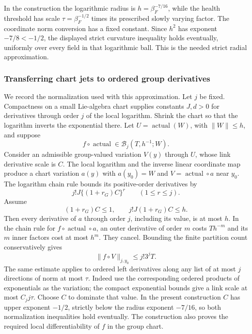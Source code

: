 In the construction the logarithmic radius is
$h=\beta_F^{-7/16}$, while the health threshold has scale
$\tau=\beta_F^{-1/2}$ times its prescribed slowly varying factor.
The coordinate norm conversion has a fixed constant. Since
$h^2$ has exponent $-7/8<-1/2$, the displayed strict curvature
inequality holds eventually, uniformly over every field in that
logarithmic ball. This is the needed strict radial approximation.

\subsubsection{Transferring chart jets to ordered group derivatives}
We record the normalization used with this approximation. Let $j$
be fixed. Compactness on a small Lie-algebra chart supplies constants
$J,d>0$ for derivatives through order $j$ of the local logarithm.
Shrink the chart so that the logarithm inverts the exponential there.
Let $U=\operatorname{actual}(W)$, with $\|W\|\le h$, and suppose
\[
            f\circ\operatorname{actual}\in
                       \mathcal B_j(T,h^{-1};W).
\]
Consider an admissible group-valued variation $V(y)$ through $U$,
whose link derivative scale is $C$. The local logarithm and the
inverse linear coordinate map produce a chart variation $a(y)$
with $a(y_0)=W$ and $V=\operatorname{actual}\circ a$ near $y_0$.
The logarithm chain rule bounds its positive-order derivatives by
\[
             j!J\{(1+r_G)C\}^{r}\qquad(1\le r\le j).
\]
Assume
\[
       (1+r_G)C\le1,
             \qquad j!J(1+r_G)C\le h.
\]
Then every derivative of $a$ through order $j$, including its value,
is at most $h$. In the chain rule for $f\circ\operatorname{actual}\circ a$,
an outer derivative of order $m$ costs $Th^{-m}$ and its $m$
inner factors cost at most $h^m$. They cancel. Bounding the finite
partition count conservatively gives
\begin{equation}\label{eq:healthy-chart-ticket}
                       \|f\circ V\|_{j,y_0}\le j!3^jT.
\end{equation}
The same estimate applies to ordered left derivatives along any
list of at most $j$ directions of norm at most $\tau$. Indeed use
the corresponding ordered products of exponentials as the variation;
the compact exponential bounds give a link scale at most $C_jj\tau$.
Choose $C$ to dominate that value. In the present construction
$C$ has upper exponent $-1/2$, strictly below the radius exponent
$-7/16$, so both normalization inequalities hold eventually.
The construction also proves the required local differentiability
of $f$ in the group chart.

